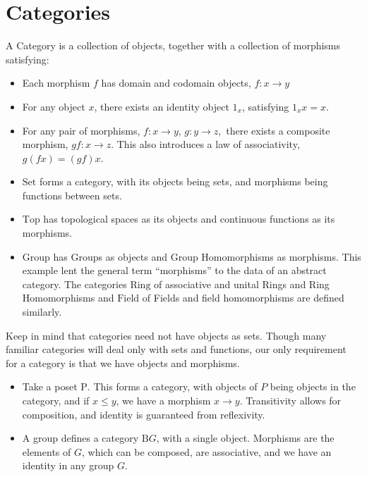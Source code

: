 \documentclass{article}
\begin{document}
\section{Categories}
\begin{defn}
    A Category is a collection of objects, together with a collection of morphisms satisfying:
    \begin{itemize}
        \item Each morphism $f$ has domain and codomain objects, $f:x\to y$
        \item For any object $x$, there exists an identity object $1_x$, satisfying $1_x x=x$.
        \item For any pair of morphisms, $f:x\to y$, $g:y\to z,$ there exists a composite morphism, $gf:x\to z$. This also introduces a law of associativity, $g(fx)=(gf)x$.    
    \end{itemize}
\end{defn}
\begin{exmp}
    \begin{itemize}
        \item $\mathrm{Set}$ forms a category, with its objects being sets, and morphisms being functions between sets.
        \item  $\mathrm{Top}$ has topological spaces as its objects and continuous functions as its morphisms.
        \item  $\mathrm{Group}$ has Groups as objects and Group Homomorphisms as morphisms. This example lent the general term “morphisms” to the data of an abstract category. The categories $\mathrm{Ring}$ of associative and unital Rings and Ring Homomorphisms and $\mathrm{Field}$ of Fields and field homomorphisms are defined similarly.
    \end{itemize}
\end{exmp}
\begin{exmp}
    Keep in mind that categories need not have objects as sets. Though many familiar categories will deal only with sets and functions, our only requirement for a category is that we have objects and morphisms.
    \begin{itemize}
        \item Take a poset $\mathrm{P}$. This forms a category, with objects of $P$ being objects in the category, and if $x\leq y$, we have a morphism $x\to y$. Transitivity allows for composition, and identity is guaranteed from reflexivity.
        \item A group defines a category $\mathrm{B}G$, with a single object. Morphisms are the elements of $G$, which can be composed, are associative, and we have an identity in any group $G$.
    \end{itemize}
    \iffalse
    \begin{rem}
        It may assist the reader to consider the single object in the category of a group as an object invariant under the action of the group. So consider a square, under the action of $D_4$. Every morphism of $\mathrm{B}D_4$ (element of $D_4$) leaves the square as it is, 
    \end{rem}
\fi
\end{exmp}
\end{document}
